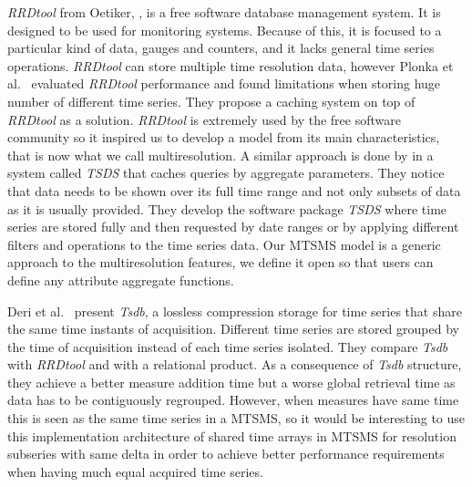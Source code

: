 \emph{RRDtool} from Oetiker, \cite{rrdtool,lisa98:oetiker}, is a free
software database management system. It is designed to be used for
monitoring systems. Because of this, it is focused to a particular
kind of data, gauges and counters, and it lacks general time series
operations. \emph{RRDtool} can store multiple time resolution data,
however Plonka et al.\ \cite{lisa07:plonka} evaluated \emph{RRDtool}
performance and found limitations when storing huge number of
different time series. They propose a caching system on top of
\emph{RRDtool} as a solution.  \emph{RRDtool} is extremely used by the
free software community so it inspired us to develop a model from its
main characteristics, that is now what we call multiresolution. A
similar approach is done by \cite{weigel10} in a system called
\emph{TSDS} that caches queries by aggregate parameters. They notice
that data needs to be shown over its full time range and not only
subsets of data as it is usually provided.  They develop the software
package \emph{TSDS} where time series are stored fully and then
requested by date ranges or by applying different filters and
operations to the time series data.  Our MTSMS model is a generic
approach to the multiresolution features, we define it open so that
users can define any attribute aggregate functions.


Deri et al.\ \cite{deri12:tsdb_compressed_database} present
\emph{Tsdb}, a lossless compression storage  for time
series that share the same time instants of acquisition. Different
time series are stored grouped by the time of acquisition instead of
each time series isolated.  They compare \emph{Tsdb} with \emph{RRDtool} and
with a relational product. As a consequence of \emph{Tsdb} structure,
they achieve a better measure addition time but a worse global
retrieval time as data has to be contiguously regrouped. However, when
measures have same time this is seen as the same time series in a
MTSMS, so it would be interesting to use this implementation
architecture of shared time arrays in MTSMS for resolution subseries
with same delta in order to achieve better performance requirements
when having much equal acquired time series.



